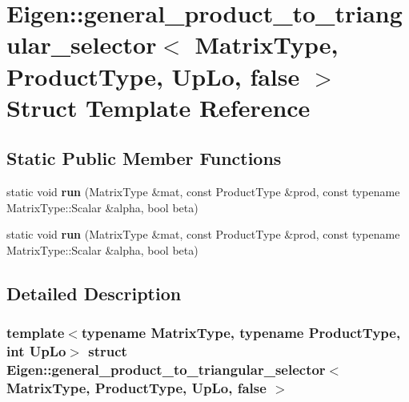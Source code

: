 \hypertarget{struct_eigen_1_1general__product__to__triangular__selector_3_01_matrix_type_00_01_product_type_00_01_up_lo_00_01false_01_4}{}\section{Eigen\+:\+:general\+\_\+product\+\_\+to\+\_\+triangular\+\_\+selector$<$ Matrix\+Type, Product\+Type, Up\+Lo, false $>$ Struct Template Reference}
\label{struct_eigen_1_1general__product__to__triangular__selector_3_01_matrix_type_00_01_product_type_00_01_up_lo_00_01false_01_4}
\subsection*{Static Public Member Functions}
\begin{DoxyCompactItemize}
\item 
\mbox{\label{struct_eigen_1_1general__product__to__triangular__selector_3_01_matrix_type_00_01_product_type_00_01_up_lo_00_01false_01_4_ab4cfef58a2bbaf0c2f8152162c0509d4}} 
static void {\bfseries run} (Matrix\+Type \&mat, const Product\+Type \&prod, const typename Matrix\+Type\+::\+Scalar \&alpha, bool beta)
\item 
\mbox{\label{struct_eigen_1_1general__product__to__triangular__selector_3_01_matrix_type_00_01_product_type_00_01_up_lo_00_01false_01_4_ab4cfef58a2bbaf0c2f8152162c0509d4}} 
static void {\bfseries run} (Matrix\+Type \&mat, const Product\+Type \&prod, const typename Matrix\+Type\+::\+Scalar \&alpha, bool beta)
\end{DoxyCompactItemize}


\subsection{Detailed Description}
\subsubsection*{template$<$typename Matrix\+Type, typename Product\+Type, int Up\+Lo$>$\newline
struct Eigen\+::general\+\_\+product\+\_\+to\+\_\+triangular\+\_\+selector$<$ Matrix\+Type, Product\+Type, Up\+Lo, false $>$}



